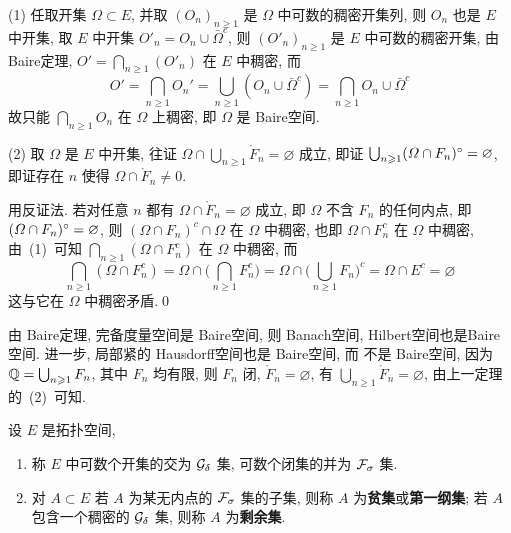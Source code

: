 	\begin{Proof}
		(1) 任取开集 $ \varOmega\subset E $, 并取 $ (O_{n})_{n\geqslant1} $ 是 $ \varOmega $ 中可数的稠密开集列, 则 $ O_{n} $ 也是 $ E $ 中开集, 取 $ E $ 中开集 $ O'_{n}=O_{n}\cup\bar{\varOmega}^{c} $, 则 $ (O'_{n})_{n\geqslant1} $ 是 $ E $ 中可数的稠密开集, 由 Baire定理, $ O'=\bigcap_{n\geqslant1}(O'_{n}) $ 在 $ E $ 中稠密, 而
		\[
			O'=\bigcap_{n\geqslant1}O_{n}'=\bigcup_{n\geqslant1}(O_{n}\cup\bar{\varOmega}^{c})=\bigcap_{n\geqslant1}O_{n}\cup \bar{\varOmega}^{c}
		\]
		故只能 $ \bigcap_{n\geqslant1}O_{n} $ 在 $ \varOmega $ 上稠密, 即 $ \varOmega $ 是 Baire空间.

		(2) 取 $ \varOmega $ 是 $ E $ 中开集, 往证 $ \varOmega\cap\bigcup_{n\geqslant1}\mathring F_{n}=\varnothing $ 成立, 即证 $ \bigcup_{n\geqslant1}(\varOmega\cap F_{n})^{\circ}=\varnothing $, 即证存在  $ n $ 使得 $ \varOmega\cap\mathring{F}_{n}\ne0 $.

		用反证法. 若对任意 $ n $ 都有 $ \varOmega\cap\mathring{F}_{n}=\varnothing $ 成立, 即 $ \varOmega $ 不含 $ F_{n} $ 的任何内点, 即 $ (\varOmega\cap F_{n})^{\circ}=\varnothing $, 则 $ (\varOmega\cap F_{n})^{c}\cap\varOmega $ 在 $ \varOmega $ 中稠密, 也即 $ \varOmega\cap F_{n}^{c} $ 在 $ \varOmega $ 中稠密, 由~(1)~可知 $ \bigcap_{n\geqslant1}(\varOmega\cap F_{n}^{c}) $ 在 $ \varOmega $ 中稠密, 而
		\[
			\bigcap_{n\geqslant1}(\varOmega\cap F_{n}^{c})=\varOmega\cap \Big(\bigcap_{n\geqslant1}F_{n}^{c}\Big)=\varOmega\cap\Big(\bigcup_{n\geqslant1}F_{n}\Big)^{c}=\varOmega\cap E^{c}=\varnothing
		\]
		这与它在 $ \varOmega $ 中稠密矛盾.\qed
	\end{Proof}
	\begin{Example}
		由 Baire定理, 完备度量空间是 Baire空间, 则 Banach空间, Hilbert空间也是Baire空间. 进一步, 局部紧的 Hausdorff空间也是 Baire空间, 而 \Q 不是 Baire空间, 因为 $ \mathbb{Q}=\bigcup_{n\geqslant1}F_{n} $, 其中 $ F_{n} $ 均有限, 则 $ F_{n} $ 闭,  $ \mathring{F}_{n}=\varnothing $, 有 $ \bigcup_{n\geqslant1}\mathring{F}_{n}=\varnothing $, 由上一定理的~(2)~可知. 
	\end{Example}
	\begin{Definition}[纲集]\label{def:纲集}
		设 $ E $ 是拓扑空间,
		\begin{enumerate}[(1)]
			\item 称 $ E $ 中可数个开集的交为 $ \mathcal{G}_{\delta} $ 集, 可数个闭集的并为 $ \mathcal{F}_{\sigma} $ 集.
			\item 对 $ A\subset E $ 若 $ A $ 为某无内点的 $ \mathcal{F}_{\sigma} $ 集的子集, 则称 $ A $ 为\textbf{贫集}或\textbf{第一纲集}; 若 $ A $ 包含一个稠密的 $ \mathcal{G}_{\delta} $ 集, 则称 $ A $ 为\textbf{剩余集}.
			 \end{enumerate}
	\end{Definition}
